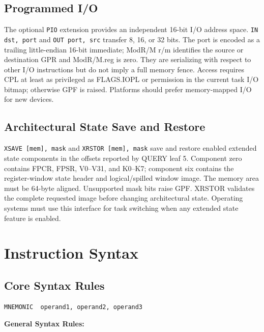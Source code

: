 \documentclass[11pt]{article}
\begin{document}
\subsection{Programmed I/O}

The optional \texttt{PIO} extension provides an independent 16-bit I/O address
space. \texttt{IN dst, port} and \texttt{OUT port, src} transfer 8, 16, or 32
bits. The port is encoded as a trailing little-endian 16-bit immediate; ModR/M
r/m identifies the source or destination GPR and ModR/M.reg is zero. They are
serializing with respect to other I/O instructions but do not imply a full
memory fence. Access requires CPL at least as privileged as FLAGS.IOPL or
permission in the current task I/O bitmap; otherwise GPF is raised. Platforms
should prefer memory-mapped I/O for new devices.

\subsection{Architectural State Save and Restore}

\texttt{XSAVE [mem], mask} and \texttt{XRSTOR [mem], mask} save and restore enabled extended state components in the offsets reported by QUERY leaf 5. Component zero contains FPCR, FPSR, V0--V31, and K0--K7; component six contains the register-window state header and logical/spilled window image. The memory area must be 64-byte aligned. Unsupported mask bits raise GPF. XRSTOR validates the complete requested image before changing architectural state. Operating systems must use this interface for task switching when any extended state feature is enabled.

\section{Instruction Syntax}

\subsection{Core Syntax Rules}

\begin{lstlisting}[language={[x86masm]Assembler}]
MNEMONIC  operand1, operand2, operand3
\end{lstlisting}

\textbf{General Syntax Rules:}
\end{document}
